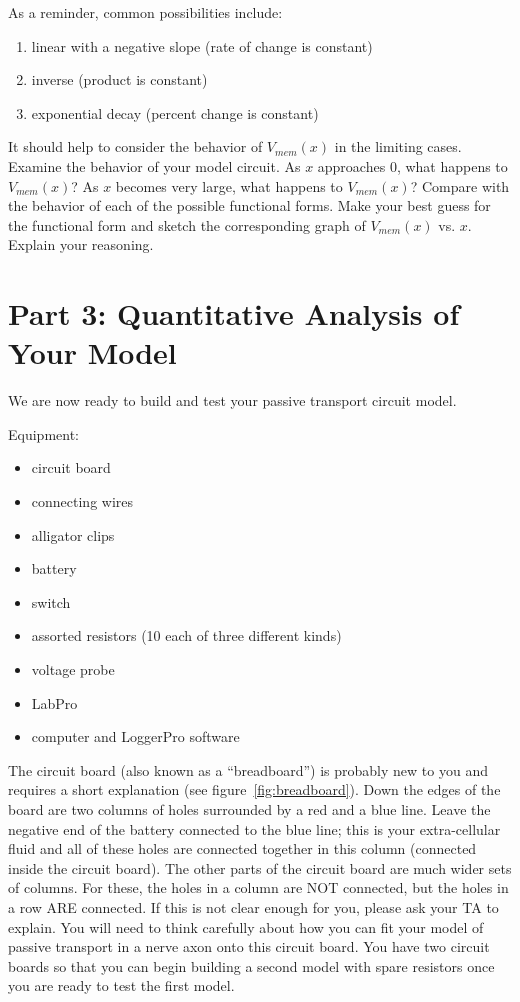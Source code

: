 As a reminder, common possibilities include:
\begin{enumerate}
\itemsep0em
\item linear with a negative slope (rate of change is constant)
\item inverse (product is constant)
\item exponential decay (percent change is constant)
\end{enumerate}
It should help to consider the behavior of $V_{mem}(x)$ in the limiting cases.
Examine the behavior of your model circuit.
As $x$ approaches $0$, what happens to $V_{mem}(x)$?
As $x$ becomes very large, what happens to $V_{mem}(x)$?
Compare with the behavior of each of the possible functional forms.
Make your best guess for the functional form and sketch the corresponding graph of $V_{mem}(x)$ vs. $x$.
Explain your reasoning.

\section*{Part 3: Quantitative Analysis of Your Model}
We are now ready to build and test your passive transport circuit model.
\par 
Equipment:
\begin{itemize}
	\itemsep-0.2em
	\item circuit board
	\item connecting wires
	\item alligator clips
	\item battery 
	\item switch
	\item assorted resistors (10 each of three different kinds)
	\item voltage probe
	\item LabPro
	\item computer and LoggerPro software
\end{itemize}
The circuit board (also known as a ``breadboard'') is probably new to you and requires a short explanation (see figure~\ref{fig:breadboard}).
Down the edges of the board are two columns of holes surrounded by a red and a blue line.
Leave the negative end of the battery connected to the blue line; this is your extra-cellular fluid and all of these holes are connected together in this column (connected inside the circuit board).
The other parts of the circuit board are much wider sets of columns.
For these, the holes in a column are NOT connected, but the holes in a row ARE connected.
If this is not clear enough for you, please ask your TA to explain.
You will need to think carefully about how you can fit your model of passive transport in a nerve axon onto this circuit board.
You have two circuit boards so that you can begin building a second model with spare resistors once you are ready to test the first model.
\par 

